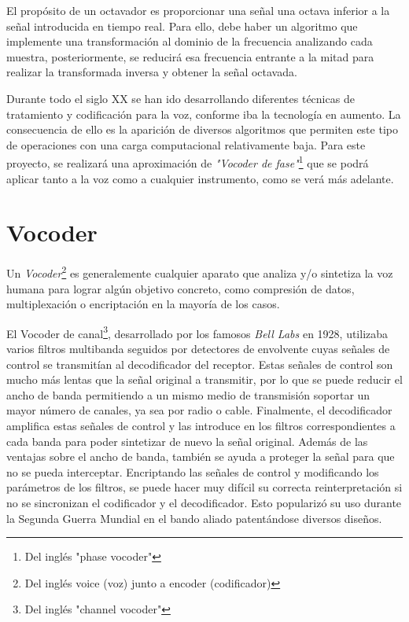 El propósito de un octavador es proporcionar una señal una octava inferior a la señal introducida en tiempo real. Para ello, debe haber un algoritmo que implemente una transformación al dominio de la frecuencia analizando cada muestra, posteriormente, se reducirá esa frecuencia entrante a la mitad para realizar la transformada inversa y obtener la señal octavada. 

Durante todo el siglo XX se han ido desarrollando diferentes técnicas de tratamiento y codificación para la voz, conforme iba la tecnología en aumento. La consecuencia de ello es la aparición de diversos algoritmos que permiten este tipo de operaciones con una carga computacional relativamente baja. Para este proyecto, se realizará una aproximación de \emph{"Vocoder de fase"}\footnote{Del inglés "phase vocoder"} que se podrá aplicar tanto a la voz como a cualquier instrumento, como se verá más adelante.

\section{Vocoder}
Un \emph{Vocoder}\footnote{Del inglés voice (voz) junto a encoder (codificador)} es generalemente cualquier aparato que analiza y/o sintetiza la voz humana para lograr algún objetivo concreto, como compresión de datos, multiplexación o encriptación en la mayoría de los casos.

El Vocoder de canal\footnote{Del inglés "channel vocoder"}, desarrollado por los famosos \emph{Bell Labs} en 1928, utilizaba varios filtros multibanda seguidos por detectores de envolvente cuyas señales de control se transmitían al decodificador del receptor. Estas señales de control son mucho más lentas que la señal original a transmitir, por lo que se puede reducir el ancho de banda permitiendo a un mismo medio de transmisión soportar un mayor número de canales, ya sea por radio o cable. Finalmente, el decodificador amplifica estas señales de control y las introduce en los filtros correspondientes a cada banda para poder sintetizar de nuevo la señal original. Además de las ventajas sobre el ancho de banda, también se ayuda a proteger la señal para que no se pueda interceptar. Encriptando las señales de control y modificando los parámetros de los filtros, se puede hacer muy difícil su correcta reinterpretación si no se sincronizan el codificador y el decodificador. Esto popularizó su uso durante la Segunda Guerra Mundial en el bando aliado patentándose diversos diseños.

